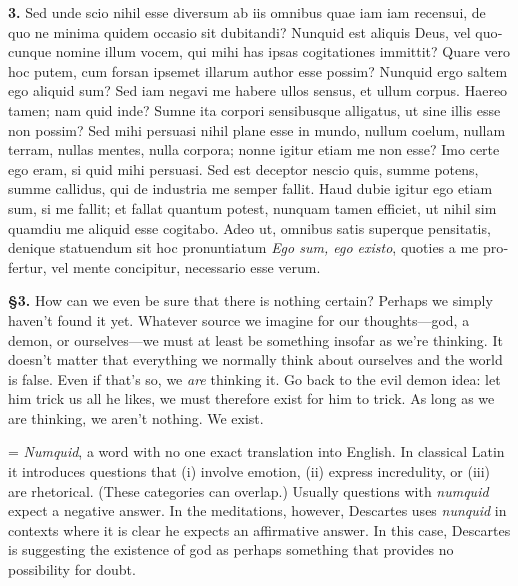 \clearpage

\beginnumbering
\pstart
\begin{latin}
    \textenglish{\textbf{3.}} Sed unde scio nihil esse diversum ab iis omnibus quae iam iam recensui, de quo ne minima quidem occasio sit dubitandi? Nunquid est aliquis Deus, vel quocunque nomine illum vocem, qui mihi has ipsas cogitationes immittit? Quare vero hoc putem, cum forsan ipsemet illarum author esse possim? Nunquid ergo saltem ego aliquid sum? Sed iam negavi me habere ullos sensus, et ullum corpus. Haereo tamen; nam quid  inde? Sumne ita corpori sensibusque alligatus, ut sine illis esse non possim? Sed mihi persuasi nihil plane esse in mundo, nullum coelum, nullam terram, nullas mentes, nulla corpora; nonne igitur etiam me non esse? Imo certe ego eram, si quid mihi persuasi. Sed est deceptor nescio quis, summe potens, summe callidus, qui de industria me semper fallit. Haud dubie igitur ego etiam sum, si me fallit; et fallat quantum potest, nunquam tamen efficiet, ut nihil sim quamdiu me aliquid esse cogitabo. Adeo ut, omnibus satis superque pensitatis, denique statuendum sit hoc pronuntiatum \textit{Ego sum, ego existo}, quoties a me profertur, vel mente concipitur, necessario esse verum.
\end{latin}
\pend
\endnumbering

\prenotes

\textbf{§3.} How can we even be sure that there is nothing certain? Perhaps we simply haven't found it yet. Whatever source we imagine for our thoughts---god, a demon, or ourselves---we must at least be something insofar as we're thinking. It doesn't matter that everything we normally think about ourselves and the world is false. Even if that's so, we \textit{are} thinking it. Go back to the evil demon idea: let him trick us all he likes, we must therefore exist for him to trick. As long as we are thinking, we aren't nothing. We exist.

 = \textit{Numquid}, a word with no one exact translation into English. In classical Latin it introduces questions that (i) involve emotion, (ii) express incredulity, or (iii) are rhetorical. (These categories can overlap.) Usually questions with \textit{numquid} expect a negative answer. In the meditations, however, Descartes uses \textit{nunquid} in contexts where it is clear he expects an affirmative answer. In this case, Descartes is suggesting the existence of god as perhaps something that provides no possibility for doubt.

